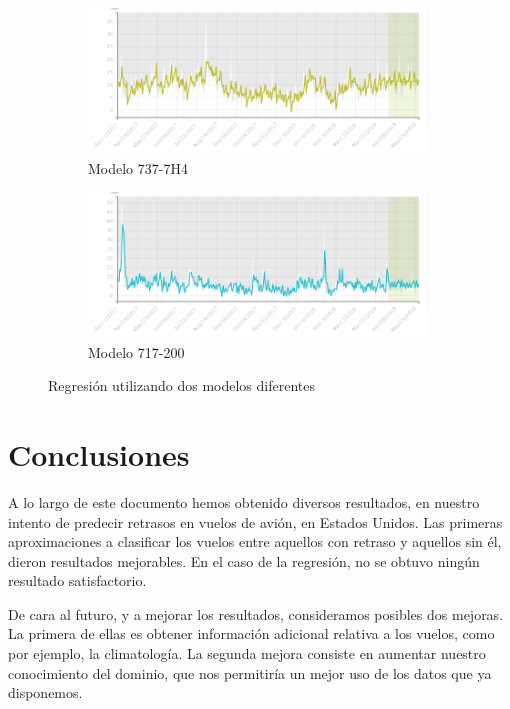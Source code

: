\documentclass[format=acmsmall, review=false, screen=true]{acmart}
\begin{document}
\begin{figure}[bht]
	\centering
	\begin{subfigure}{\linewidth}
		\centering
		\includegraphics[width=9cm]{Regresion-737.png}
		\caption{Modelo 737-7H4}
		\label{fig:Regresion737_2}
	\end{subfigure}
	\begin{subfigure}{\linewidth}
		\centering
		\includegraphics[width=9cm]{Regresion-717.png}
		\caption{Modelo 717-200}
		\label{fig:Regresion717}
	\end{subfigure}
	\caption{Regresión utilizando dos modelos diferentes}
	\label{fig:Regresion_737_717}
\end{figure} 

\section{Conclusiones}

A lo largo de este documento hemos obtenido diversos resultados, en nuestro intento de predecir retrasos en vuelos de avión, en Estados Unidos. Las primeras aproximaciones a clasificar los vuelos entre aquellos con retraso y aquellos sin él, dieron resultados mejorables. En el caso de la regresión, no se obtuvo ningún resultado satisfactorio.

De cara al futuro, y a mejorar los resultados, consideramos posibles dos mejoras. La primera de ellas es obtener información adicional relativa a los vuelos, como por ejemplo, la climatología. La segunda mejora consiste en aumentar nuestro conocimiento del dominio, que nos permitiría un mejor uso de los datos que ya disponemos.


\end{document}
